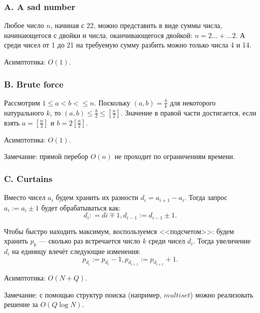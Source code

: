\subsubsection*{A. A sad number} 


Любое число $n$, начиная с 22, можно представить в виде суммы числа, начинающегося с двойки и числа, оканчивающегося двойкой: $n = 2\dots + \dots 2$. А среди чисел от 1 до 21 на требуемую сумму разбить можно только
числа 4 и 14.

Асимптотика: $O(1)$.



\subsubsection*{B. Brute force} 


Рассмотрим $1 \leqslant a < b < \leqslant n$. Поскольку $(a, b) = \frac{b}{k}$ для некоторого натурального $k$, то $(a, b) \leqslant \frac{b}{2} \leqslant \left[ \frac{n}{2}\right]$. Значение в правой части достигается, если взять $a = \left[ \frac{n}{2}\right]$ и $b = 2 \left[ \frac{n}{2}\right]$.

Асимптотика: $O(1)$.

Замечание: прямой перебор $O(n)$ не проходит по ограничениям времени.



\subsubsection*{C. Curtains} 


Вместо чисел $a_i$ будем хранить их разности $d_i = a_{i+1} - a_i$. Тогда запрос $a_i := a_i \pm 1$ будет
обрабатываться как: 
$$d_i: = di \mp 1, d_{i-1} := d_{i-1} \pm 1.$$ 

Чтобы быстро находить максимум, воспользуемся <<подсчетом>>: будем хранить $p_k$ --- сколько раз встречается число $k$ среди чисел $d_i$. Тогда увеличение $d_i$ на единицу влечёт следующие изменения:
$$p_{d_{i}} := p_{d_{i}}-1, p_{d_{i+1}} := p_{d_{i+1}} + 1.$$

Асимптотика: $O(N+Q)$.

Замечание: с помощью структур поиска (например, $multiset$) можно реализовать решение за $O(Q \log{N})$.



